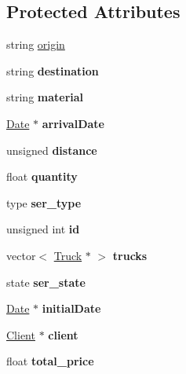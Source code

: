 \subsection*{Protected Attributes}
\begin{DoxyCompactItemize}
\item 
string \hyperlink{class_service_a0e23ac4930720ab597a5c584703151f9}{origin}
\item 
\mbox{\label{class_service_abf66f5a213e665172a45cb304fae31ad}} 
string {\bfseries destination}
\item 
\mbox{\label{class_service_a04a4efb2434d7c4acb7c43bfef2d9c52}} 
string {\bfseries material}
\item 
\mbox{\label{class_service_a1e1bdf965c61c9d52c6992beb5594032}} 
\hyperlink{class_date}{Date} $\ast$ {\bfseries arrival\+Date}
\item 
\mbox{\label{class_service_ad183cae7d3eeb78860669d209f4e7387}} 
unsigned {\bfseries distance}
\item 
\mbox{\label{class_service_afef38ab183af6a2b6fba08400c9eb987}} 
float {\bfseries quantity}
\item 
\mbox{\label{class_service_acb458e8692722cfba06273fb938c2bf8}} 
type {\bfseries ser\+\_\+type}
\item 
\mbox{\label{class_service_adae62762a30190e27f24e40c7dbebae5}} 
unsigned int {\bfseries id}
\item 
\mbox{\label{class_service_a179356d0a67dfff27fb9417db0c9357b}} 
vector$<$ \hyperlink{class_truck}{Truck} $\ast$ $>$ {\bfseries trucks}
\item 
\mbox{\label{class_service_ae0321f4e4847e9e413910831262c89c4}} 
state {\bfseries ser\+\_\+state}
\item 
\mbox{\label{class_service_a16f7facc8c1f9dd5ad1a58750e20aea1}} 
\hyperlink{class_date}{Date} $\ast$ {\bfseries initial\+Date}
\item 
\mbox{\label{class_service_ac7249f01861124261b7b4b23bb27ab3e}} 
\hyperlink{class_client}{Client} $\ast$ {\bfseries client}
\item 
\mbox{\label{class_service_a9aad689e8f65b495425fda35cf5662ed}} 
float {\bfseries total\+\_\+price}
\end{DoxyCompactItemize}
